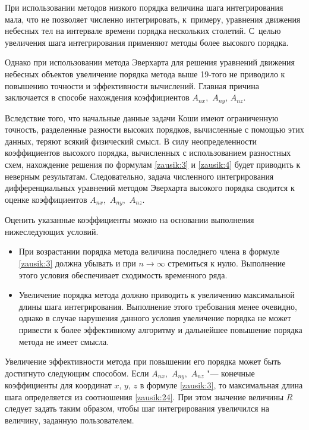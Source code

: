 При использовании методов низкого порядка величина шага интегрирования мала, что не позволяет численно интегрировать, к~примеру, уравнения движения небесных тел на интервале времени порядка нескольких столетий. 
С~целью увеличения шага интегрирования применяют методы более высокого порядка. 

Однако при использовании метода  Эверхарта для решения уравнений движения небесных объектов увеличение порядка метода выше 19-того не приводило к повышению точности и эффективности вычислений. 
Главная причина заключается в способе нахождения коэффициентов $A_{nx},$ $A_{ny}$, $A_{nz}$.

Вследствие того, что начальные данные задачи Коши имеют ограниченную точность, разделенные разности высоких порядков, вычисленные с помощью этих данных, теряют всякий физический смысл. В силу неопределенности коэффициентов высокого порядка, вычисленных с использованием разностных схем, нахождение решения по формулам \eqref{zausik:3} и \eqref{zausik:4} будет приводить к неверным результатам. Следовательно, задача численного интегрирования дифференциальных уравнений методом  Эверхарта высокого порядка сводится к оценке коэффициентов $A_{nx},$ $A_{ny},$ $A_{nz}$.

Оценить указанные коэффициенты можно на основании выполнения нижеследующих условий.

\begin{itemize}
\item[1.] При возрастании порядка метода величина последнего члена в формуле \eqref{zausik:3} должна убывать и при  $n\to\infty$ стремиться к нулю. Выполнение этого условия обеспечивает сходимость временного ряда.

\item[2.] Увеличение порядка метода должно приводить к увеличению максимальной длины шага интегрирования. Выполнение этого требования менее очевидно, однако в случае нарушения данного условия увеличение порядка не может привести к более эффективному алгоритму и дальнейшее повышение порядка метода не имеет смысла.
\end{itemize}


Увеличение эффективности метода при повышении его порядка может быть достигнуто следующим способом.  Если $A_{nx},$ $A_{ny},$ $A_{nz}$ "--- конечные коэффициенты для координат $x$, $y$, $z$ в формуле \eqref{zausik:3}, то  максимальная длина шага определяется из соотношения \eqref{zausik:24}. 
При этом значение величины $R$ следует задать таким образом, чтобы шаг интегрирования увеличился на величину, заданную пользователем.

